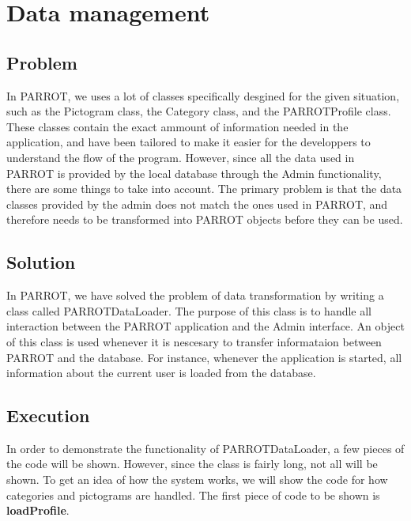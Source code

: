 \section{Data management}
\subsection{Problem}
In PARROT, we uses a lot of classes specifically desgined for the given situation, such as the Pictogram class, the Category class, and the PARROTProfile class.
These classes contain the exact ammount of information needed in the application, and have been tailored to make it easier for the developpers to understand the flow of the program. However, since all the data used in PARROT is provided by the local database through the Admin functionality, there are some things to take into account.
The primary problem is that the data classes provided by the admin does not match the ones used in PARROT, and therefore needs to be transformed into PARROT objects before they can be used.

\subsection{Solution}
In PARROT, we have solved the problem of data transformation by writing a class called PARROTDataLoader. The purpose of this class is to handle all interaction between the PARROT application and the Admin interface. An object of this class is used whenever it is nescesary to transfer informataion between PARROT and the database. For instance, whenever the application is started, all information about the current user is loaded from the database.

\subsection{Execution}
In order to demonstrate the functionality of PARROTDataLoader, a few pieces of the code will be shown. However, since the class is fairly long, not all will be shown. To get an idea of how the system works, we will show the code for how categories and pictograms are handled.\newline
The first piece of code to be shown is \textbf{loadProfile}.

